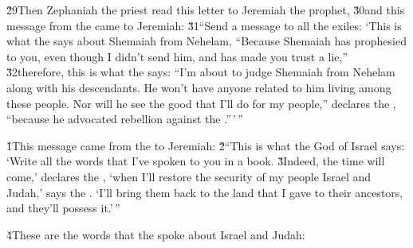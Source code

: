 \v{29}Then Zephaniah the priest read this letter to Jeremiah the prophet, \v{30}and this message from the  came to Jeremiah: \v{31}``Send a message to all the exiles: `This is what the  says about Shemaiah from Nehelam, ``Because Shemaiah has prophesied to you, even though I didn't send him, and has made you trust a lie,'' \v{32}therefore, this is what the  says: ``I'm about to judge Shemaiah from Nehelam along with his descendants. He won't have anyone related to him living among these people. Nor will he see the good that I'll do for my people,'' declares the , ``because he advocated rebellion against the .''\,'\,''

\v{1}This message came from the  to Jeremiah: \v{2}``This is what the  God of Israel says: `Write all the words that I've spoken to you in a book. \v{3}Indeed, the time will come,' declares the , `when I'll restore the security of my people Israel and Judah,' says the . `I'll bring them back to the land that I gave to their ancestors, and they'll possess it.'\,''

\v{4}These are the words that the  spoke about Israel and Judah:

